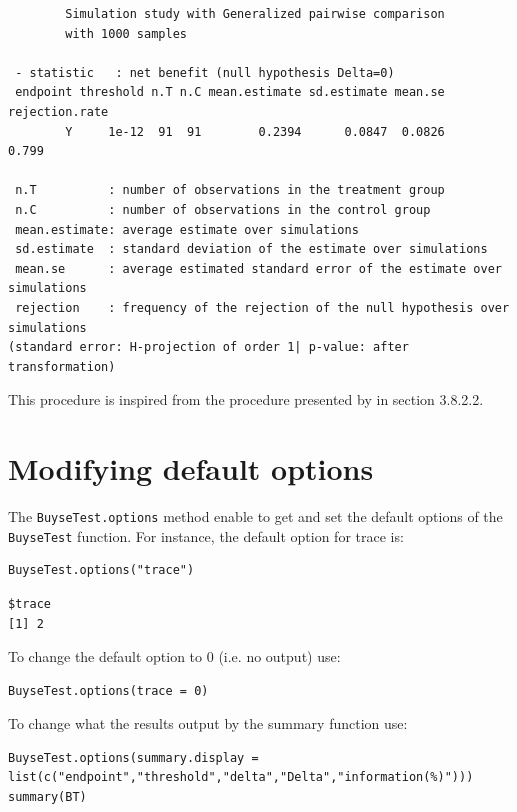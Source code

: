 \documentclass[12pt]{article}
\begin{document}
\begin{verbatim}
        Simulation study with Generalized pairwise comparison
        with 1000 samples

 - statistic   : net benefit (null hypothesis Delta=0)
 endpoint threshold n.T n.C mean.estimate sd.estimate mean.se rejection.rate
        Y     1e-12  91  91        0.2394      0.0847  0.0826          0.799

 n.T          : number of observations in the treatment group
 n.C          : number of observations in the control group
 mean.estimate: average estimate over simulations
 sd.estimate  : standard deviation of the estimate over simulations
 mean.se      : average estimated standard error of the estimate over simulations
 rejection    : frequency of the rejection of the null hypothesis over simulations
(standard error: H-projection of order 1| p-value: after transformation)
\end{verbatim}
This procedure is inspired from the procedure presented by
\cite{brunner2018rank} in section 3.8.2.2.


\clearpage

\section{Modifying default options}
\label{sec:orga4626f1}
The \texttt{BuyseTest.options} method enable to get and set the default
options of the \texttt{BuyseTest} function. For instance, the default option
for trace is:
\lstset{language=r,label= ,caption= ,captionpos=b,numbers=none}
\begin{lstlisting}
BuyseTest.options("trace")
\end{lstlisting}

\begin{verbatim}
$trace
[1] 2
\end{verbatim}


To change the default option to 0 (i.e. no output) use:
\lstset{language=r,label= ,caption= ,captionpos=b,numbers=none}
\begin{lstlisting}
BuyseTest.options(trace = 0)
\end{lstlisting}

To change what the results output by the summary function use:
\lstset{language=r,label= ,caption= ,captionpos=b,numbers=none}
\begin{lstlisting}
BuyseTest.options(summary.display = list(c("endpoint","threshold","delta","Delta","information(%)")))
summary(BT)
\end{lstlisting}
\end{document}
